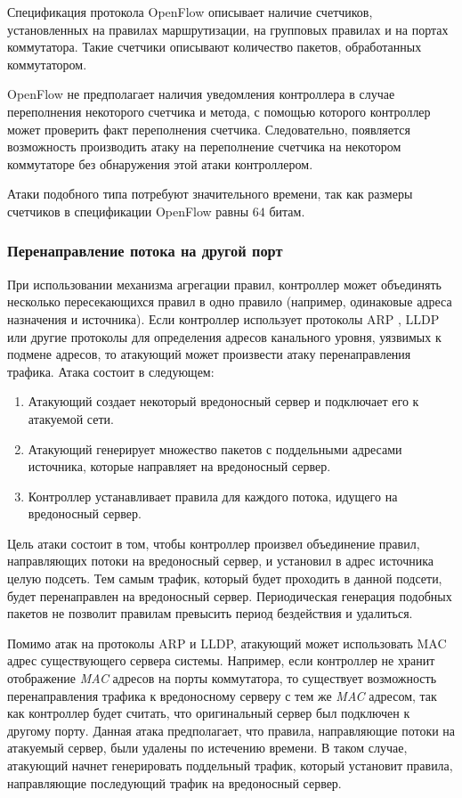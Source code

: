 \documentclass[../thesis.tex]{subfiles}
\begin{document}
Спецификация протокола OpenFlow \cite{openflow15} описывает наличие счетчиков, установленных на правилах маршрутизации, на групповых правилах и на портах коммутатора.
Такие счетчики описывают количество пакетов, обработанных коммутатором.

OpenFlow не предполагает наличия уведомления контроллера в случае переполнения некоторого счетчика и метода, с помощью которого контроллер может проверить факт переполнения счетчика.
Следовательно, появляется возможность производить атаку на переполнение счетчика на некотором коммутаторе без обнаружения этой атаки контроллером.

Атаки подобного типа потребуют значительного времени, так как размеры счетчиков в спецификации OpenFlow равны $64$ битам.

\subsubsection{Перенаправление потока на другой порт}

При использовании механизма агрегации правил, контроллер может объединять несколько пересекающихся правил в одно правило (например, одинаковые адреса назначения и источника).
Если контроллер использует протоколы ARP \cite{plummer1982ethernet}, LLDP \cite{congdon2002link} или другие протоколы для определения адресов канального уровня, уязвимых к подмене адресов, то атакующий может произвести атаку перенаправления трафика.
Атака состоит в следующем:
\begin{enumerate}
\item Атакующий создает некоторый вредоносный сервер и подключает его к атакуемой сети.
\item Атакующий генерирует множество пакетов с поддельными адресами источника, которые направляет на вредоносный сервер.
\item Контроллер устанавливает правила для каждого потока, идущего на вредоносный сервер.
\end{enumerate}

Цель атаки состоит в том, чтобы контроллер произвел объединение правил, направляющих потоки на вредоносный сервер, и установил в адрес источника целую подсеть.
Тем самым трафик, который будет проходить в данной подсети, будет перенаправлен на вредоносный сервер.
Периодическая генерация подобных пакетов не позволит правилам превысить период бездействия и удалиться.

Помимо атак на протоколы ARP и LLDP, атакующий может использовать MAC адрес существующего сервера системы.
Например, если контроллер не хранит отображение \textit{MAC} адресов \cite{hornig1984standard} на порты коммутатора, то существует возможность перенаправления трафика к вредоносному серверу с тем же \textit{MAC} адресом, так как контроллер будет считать, что оригинальный сервер был подключен к другому порту.
Данная атака предполагает, что правила, направляющие потоки на атакуемый сервер, были удалены по истечению времени.
В таком случае, атакующий начнет генерировать поддельный трафик, который установит правила, направляющие последующий трафик на вредоносный сервер.
\end{document}
